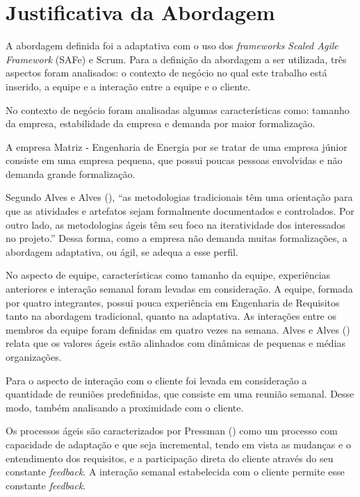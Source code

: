 \chapter[Justificativa]{Justificativa da Abordagem}



A abordagem definida foi a adaptativa com o uso dos \textit{frameworks} \emph{Scaled Agile Framework} (SAFe) e Scrum. 
Para a definição da abordagem a ser utilizada, 
três aspectos foram analisados: o contexto de negócio no qual este trabalho está inserido,
a equipe e a interação entre a equipe e o cliente.

No contexto de negócio foram analisadas algumas características como: tamanho da empresa,
estabilidade da empresa e demanda por maior formalização.

A empresa Matriz - Engenharia de Energia por se tratar de uma empresa júnior consiste
em uma empresa pequena, que possui poucas pessoas envolvidas e não demanda grande formalização.

Segundo Alves e Alves (\citeyear{alves}), ``as metodologias tradicionais têm uma orientação
para que as atividades e artefatos sejam formalmente documentados e controlados. Por outro lado, as metodologias ágeis têm seu foco
na iteratividade dos interessados no projeto.'' Dessa forma, como a empresa não demanda muitas formalizações, a abordagem adaptativa, ou ágil,
se adequa a esse perfil.

No aspecto de equipe, características como tamanho da equipe, experiências anteriores e interação semanal 
foram levadas em consideração. A equipe, formada por quatro integrantes, possui pouca experiência 
em Engenharia de Requisitos tanto na abordagem tradicional, quanto na adaptativa. 
As interações entre os membros da equipe foram definidas em quatro vezes na semana.
Alves e Alves (\citeyear{alves}) relata que os valores ágeis estão alinhados com dinâmicas de pequenas e médias organizações.

Para o aspecto de interação com o cliente foi levada em consideração a quantidade de
reuniões predefinidas, que consiste em uma reunião semanal. Desse modo, também analisando 
a proximidade com o cliente.

Os processos ágeis são caracterizados por Pressman (\citeyear{pressman}) como um
processo com capacidade de adaptação e que seja incremental, tendo em vista as
mudanças e o entendimento dos requisitos, e a participação direta do cliente através
do seu constante \textit{feedback}. A interação semanal estabelecida com o cliente permite esse constante
\textit{feedback}.

